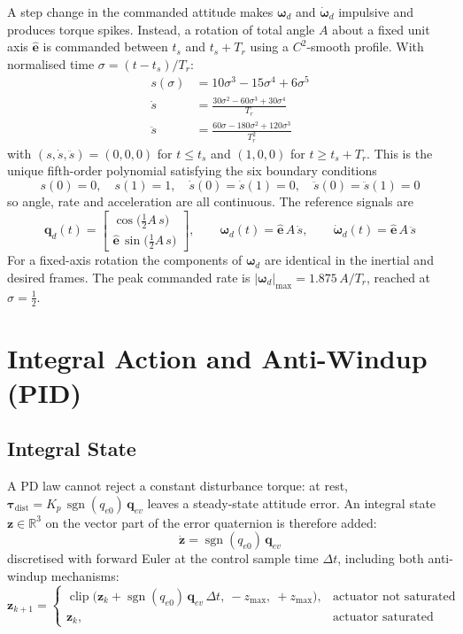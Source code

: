\documentclass[11pt, a4paper]{article}
\newcommand{\vect}[1]{\boldsymbol{#1}}
\newcommand{\w}{\vect{\omega}}
\newcommand{\sgn}{\operatorname{sgn}}
\newcommand{\clip}{\operatorname{clip}}
\begin{document}
A step change in the commanded attitude makes $\w_d$ and $\dot{\w}_d$ impulsive and produces torque spikes. Instead, a rotation of total angle $A$ about a fixed unit axis $\hat{\vect{e}}$ is commanded between $t_s$ and $t_s + T_r$ using a $C^2$-smooth profile. With normalised time $\sigma = (t - t_s)/T_r$:
\begin{align}
s(\sigma) &= 10\sigma^3 - 15\sigma^4 + 6\sigma^5 \\
\dot{s} &= \frac{30\sigma^2 - 60\sigma^3 + 30\sigma^4}{T_r} \\
\ddot{s} &= \frac{60\sigma - 180\sigma^2 + 120\sigma^3}{T_r^2}
\end{align}
with $(s, \dot{s}, \ddot{s}) = (0, 0, 0)$ for $t \le t_s$ and $(1, 0, 0)$ for $t \ge t_s + T_r$. This is the unique fifth-order polynomial satisfying the six boundary conditions
\begin{equation}
s(0) = 0, \quad s(1) = 1, \quad \dot{s}(0) = \dot{s}(1) = 0, \quad \ddot{s}(0) = \ddot{s}(1) = 0
\end{equation}
so angle, rate and acceleration are all continuous. The reference signals are
\begin{equation}
\vect{q}_d(t) = \begin{bmatrix} \cos\!\big( \tfrac{1}{2} A\, s \big) \\ \hat{\vect{e}}\, \sin\!\big( \tfrac{1}{2} A\, s \big) \end{bmatrix},
\qquad
\w_d(t) = \hat{\vect{e}}\, A\, \dot{s},
\qquad
\dot{\w}_d(t) = \hat{\vect{e}}\, A\, \ddot{s}
\end{equation}
For a fixed-axis rotation the components of $\w_d$ are identical in the inertial and desired frames. The peak commanded rate is $\lvert \w_d \rvert_{\max} = 1.875\, A / T_r$, reached at $\sigma = \tfrac{1}{2}$.

\section{Integral Action and Anti-Windup (PID)}

\subsection{Integral State}
A PD law cannot reject a constant disturbance torque: at rest, $\vect{\tau}_{\text{dist}} = K_p\, \sgn(q_{e0})\, \vect{q}_{ev}$ leaves a steady-state attitude error. An integral state $\vect{z} \in \mathbb{R}^3$ on the vector part of the error quaternion is therefore added:
\begin{equation}
\dot{\vect{z}} = \sgn(q_{e0})\, \vect{q}_{ev}
\end{equation}
discretised with forward Euler at the control sample time $\Delta t$, including both anti-windup mechanisms:
\begin{equation}
\vect{z}_{k+1} =
\begin{cases}
\clip\!\big( \vect{z}_k + \sgn(q_{e0})\, \vect{q}_{ev}\, \Delta t,\ -z_{\max},\ +z_{\max} \big), & \text{actuator not saturated} \\[1ex]
\vect{z}_k, & \text{actuator saturated}
\end{cases}
\end{equation}
\end{document}
